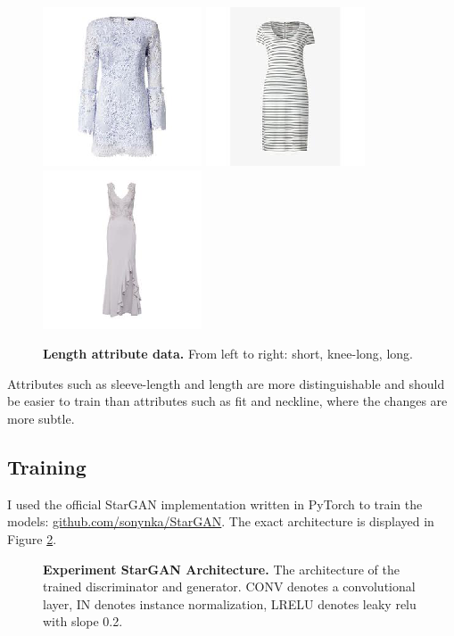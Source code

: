 \documentclass[12pt]{report}
\begin{document}
\begin{figure}[!h]
{\includegraphics[width=.23\linewidth]{03_analysis/data/length_short}}
{\includegraphics[width=.23\linewidth]{03_analysis/data/length_knee}}
{\includegraphics[width=.23\linewidth]{03_analysis/data/length_long}}
\caption{\label{fig:length_data} \textbf{Length attribute data.} From left to right: short, knee-long, long.}
\end{figure}

\pagebreak
Attributes such as sleeve-length and length are more distinguishable and should be easier to train than attributes such as fit and neckline, where the changes are more subtle.

\pagebreak
\subsection{Training}
I used the official StarGAN implementation written in PyTorch to train the models: \hyperlink{https://github.com/sonynka/StarGAN}{github.com/sonynka/StarGAN}. The exact architecture is displayed in Figure \ref{fig:stargan_arch}.

\vspace{0.5cm}
\begin{figure}[h]
\centering
{}\vspace{.5cm}
\caption{\label{fig:stargan_arch} \textbf{Experiment StarGAN Architecture.} The architecture of the trained  discriminator and generator. CONV denotes a convolutional layer, IN denotes instance normalization, LRELU denotes leaky relu with slope 0.2.}
\end{figure}
\end{document}

